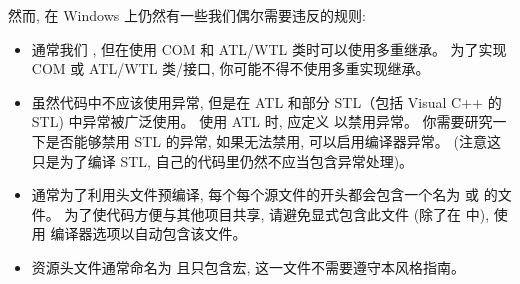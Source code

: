 然而, 在 Windows 上仍然有一些我们偶尔需要违反的规则:

\begin{itemize}
  \item 通常我们 , 但在使用 COM 和 ATL/WTL 类时可以使用多重继承。 为了实现 COM 或 ATL/WTL 类/接口, 你可能不得不使用多重实现继承。
  \item  虽然代码中不应该使用异常, 但是在 ATL 和部分 STL（包括 Visual C++ 的 STL) 中异常被广泛使用。 使用 ATL 时, 应定义  以禁用异常。 你需要研究一下是否能够禁用 STL 的异常, 如果无法禁用, 可以启用编译器异常。 (注意这只是为了编译 STL, 自己的代码里仍然不应当包含异常处理)。
  \item  通常为了利用头文件预编译, 每个每个源文件的开头都会包含一个名为  或  的文件。 为了使代码方便与其他项目共享, 请避免显式包含此文件 (除了在  中), 使用  编译器选项以自动包含该文件。
  \item  资源头文件通常命名为  且只包含宏, 这一文件不需要遵守本风格指南。
\end{itemize}